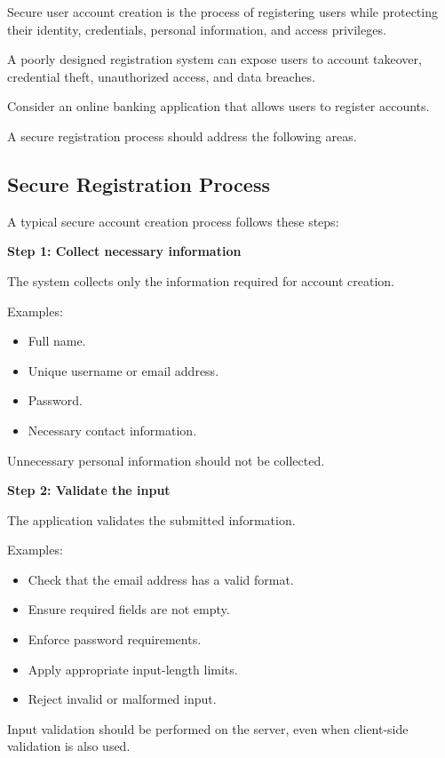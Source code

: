 Secure user account creation is the process of registering users while protecting their identity, credentials, personal information, and access privileges.

A poorly designed registration system can expose users to account takeover, credential theft, unauthorized access, and data breaches.

Consider an online banking application that allows users to register accounts.

A secure registration process should address the following areas.

\subsection{Secure Registration Process}

A typical secure account creation process follows these steps:

\textbf{Step 1: Collect necessary information}

The system collects only the information required for account creation.

Examples:

\begin{itemize}
\item Full name.
\item Unique username or email address.
\item Password.
\item Necessary contact information.
\end{itemize}

Unnecessary personal information should not be collected.

\textbf{Step 2: Validate the input}

The application validates the submitted information.

Examples:

\begin{itemize}
\item Check that the email address has a valid format.
\item Ensure required fields are not empty.
\item Enforce password requirements.
\item Apply appropriate input-length limits.
\item Reject invalid or malformed input.
\end{itemize}

Input validation should be performed on the server, even when client-side validation is also used.

